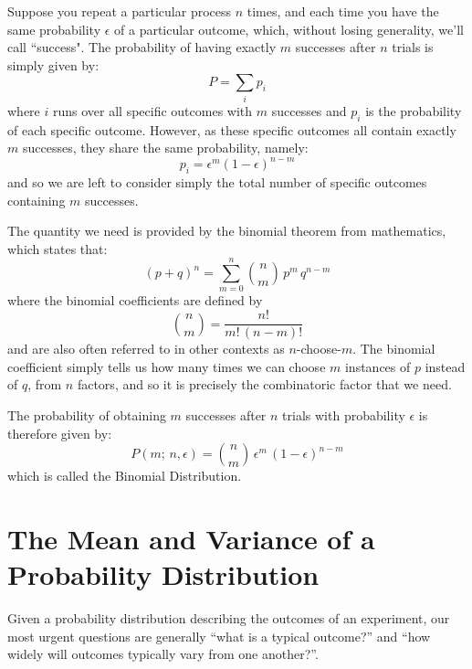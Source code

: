 \documentclass[12pt,oneside]{book}
\begin{document}
Suppose you repeat a particular process $n$ times, and each time you
have the same probability $\epsilon$ of a particular outcome, which,
without losing generality, we'll call ``success".  The probability of
having exactly $m$ successes after $n$ trials is simply given by:
\begin{displaymath}
P = \sum_i p_i
\end{displaymath}
where $i$ runs over all specific outcomes with $m$ successes and $p_i$
is the probability of each specific outcome.  However, as these
specific outcomes all contain exactly $m$ successes, they share the
same probability, namely:
\begin{displaymath}
p_i = \epsilon^m (1 - \epsilon)^{n-m}
\end{displaymath}
and so we are left to consider simply the total number of specific outcomes containing $m$ successes.  

The quantity we need is provided by the binomial theorem from mathematics, which states that:
\begin{equation}
\label{eqn:binomt}
(p+q)^n = \sum_{m=0}^{n} \binom{n}{m} \, p^m \, q^{n-m}
\end{equation}
where the binomial coefficients are defined by
\begin{equation}
\label{eqn:binomc}
\binom{n}{m} = \frac{n!}{m! \, (n-m)!}
\end{equation}
and are also often referred to in other contexts as $n$-choose-$m$.  The binomial coefficient simply tells us how many times we can choose $m$ instances of $p$ instead of $q$, from $n$ factors, and so it is precisely the combinatoric factor that we need.

The probability of obtaining $m$ successes after $n$ trials with probability $\epsilon$ is therefore given by:
\begin{equation}
\label{eqn:binom}
P(m; \, n ,\epsilon) = \binom{n}{m} \, \epsilon^m \, (1 - \epsilon)^{n-m}
\end{equation}
which is called the Binomial Distribution.

\section{The Mean and Variance of a Probability Distribution}

Given a probability distribution describing the outcomes of an
experiment, our most urgent questions are generally ``what is a
typical outcome?'' and ``how widely will outcomes typically vary from
one another?''.
\end{document}
